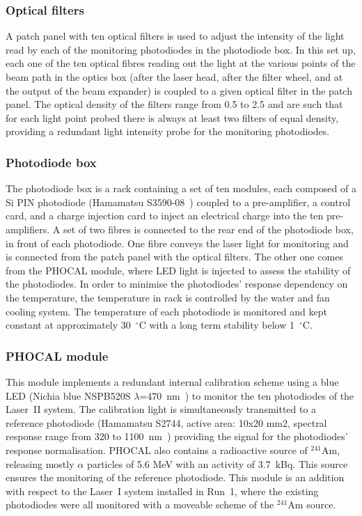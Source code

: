 \subsubsection*{Optical filters}


A patch panel with ten optical filters is used to adjust the intensity of the light read by each of the monitoring photodiodes in the photodiode box. In this set up, each one of the ten optical fibres reading out the light at the various points of the beam path in the optics box (after the laser head, after the filter wheel, and at the output of the beam expander) is coupled to a given optical filter in the patch panel. The optical density of the filters range from 0.5 to 2.5 and are such that for each light point probed there is always at least two filters of equal density, providing a redundant light intensity probe for the monitoring photodiodes.

\subsubsection*{Photodiode box}

The photodiode box is a rack containing a set of ten modules, each composed of a Si PIN photodiode (Hamamatsu S3590-08~\cite{ref:photodiode}) coupled to a pre-amplifier, a control card, and a charge injection card to inject an electrical charge into the ten pre-amplifiers. A set of two fibres is connected to the rear end of the photodiode box, in front of each photodiode. One fibre conveys the laser light for monitoring and is connected from the patch panel with the optical filters. The other one comes from the PHOCAL module, where LED light is injected to assess the stability of the photodiodes. In order to minimise the photodiodes' response dependency on the temperature, the temperature in rack is controlled by the water and fan cooling system. The temperature of each photodiode is monitored and kept constant at approximately 30~$^\circ$C with a long term stability below 1~$^\circ$C.

\subsubsection*{PHOCAL module}

This module implements a redundant internal calibration scheme using a blue LED (Nichia blue NSPB520S $\lambda$=470~nm~\cite{ref:led}) to monitor the ten photodiodes of the Laser~II system. The calibration light is simultaneously transmitted to a reference photodiode (Hamamatsu S2744, active area: 10x20 mm2, spectral response range from 320 to 1100~nm~\cite{ref:bigphoto}) providing the signal for the photodiodes' response normalisation. PHOCAL also contains a radioactive source of $^{241}$Am, releasing mostly $\alpha$ particles of 5.6 MeV with an activity of 3.7~kBq. This source ensures the monitoring of the reference photodiode. This module is an addition with respect to the Laser~I system installed in Run~1, where the existing photodiodes were all monitored with a moveable scheme of the $^{241}$Am source.

